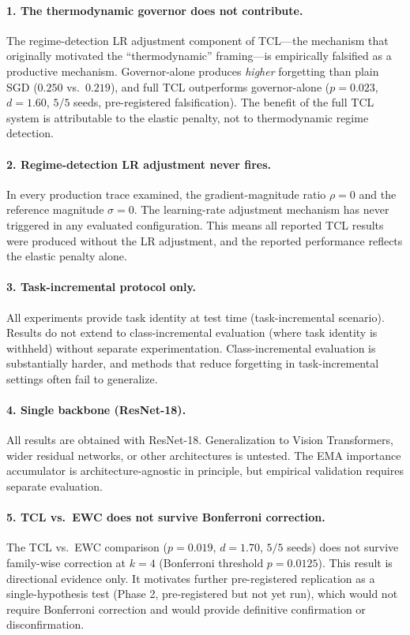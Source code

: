 \documentclass[10pt,letterpaper]{article}
\newcommand{\TCL}{\textsc{TCL}}
\newcommand{\SGD}{\textsc{SGD}}
\begin{document}
\paragraph{1. The thermodynamic governor does not contribute.}
The regime-detection LR adjustment component of \TCL{}---the mechanism that
originally motivated the ``thermodynamic'' framing---is empirically falsified as
a productive mechanism.
Governor-alone produces \emph{higher} forgetting than plain \SGD{} ($0.250$
vs.\ $0.219$), and full \TCL{} outperforms governor-alone ($p{=}0.023$,
$d{=}1.60$, $5/5$ seeds, pre-registered falsification).
The benefit of the full \TCL{} system is attributable to the elastic penalty,
not to thermodynamic regime detection.

\paragraph{2. Regime-detection LR adjustment never fires.}
In every production trace examined, the gradient-magnitude ratio $\rho{=}0$
and the reference magnitude $\sigma{=}0$.
The learning-rate adjustment mechanism has never triggered in any evaluated
configuration.
This means all reported \TCL{} results were produced without the LR
adjustment, and the reported performance reflects the elastic penalty alone.

\paragraph{3. Task-incremental protocol only.}
All experiments provide task identity at test time (task-incremental scenario).
Results do not extend to class-incremental evaluation (where task identity is
withheld) without separate experimentation.
Class-incremental evaluation is substantially harder, and methods that reduce
forgetting in task-incremental settings often fail to generalize.

\paragraph{4. Single backbone (ResNet-18).}
All results are obtained with ResNet-18.
Generalization to Vision Transformers, wider residual networks, or other
architectures is untested.
The EMA importance accumulator is architecture-agnostic in principle, but
empirical validation requires separate evaluation.

\paragraph{5. TCL vs.\ EWC does not survive Bonferroni correction.}
The TCL vs.\ EWC comparison ($p{=}0.019$, $d{=}1.70$, $5/5$ seeds) does not
survive family-wise correction at $k{=}4$ (Bonferroni threshold $p{=}0.0125$).
This result is directional evidence only.
It motivates further pre-registered replication as a single-hypothesis test
(Phase 2, pre-registered but not yet run), which would not require Bonferroni
correction and would provide definitive confirmation or disconfirmation.
\end{document}
